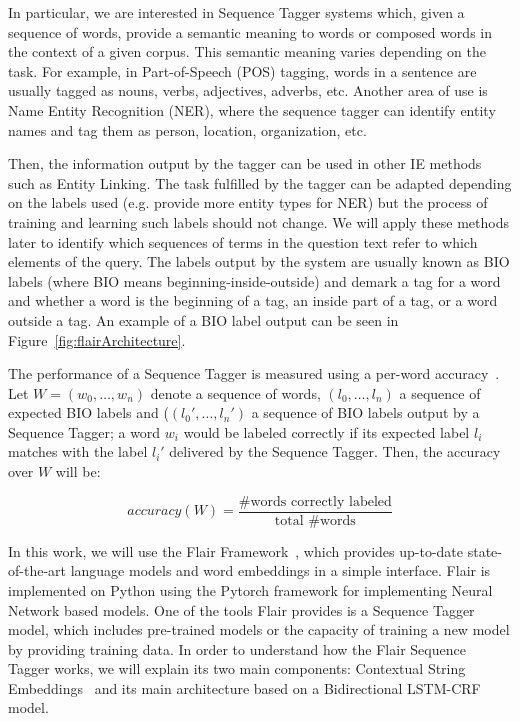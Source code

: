 In particular, we are interested in Sequence Tagger systems which, given a sequence of 
words, provide a semantic meaning to words or composed words in the context of a given 
corpus. This semantic meaning varies depending on the task. For example, in Part-of-Speech 
(POS) tagging, words in a sentence are usually tagged as nouns, verbs, adjectives, adverbs, 
etc. Another area of use is Name Entity Recognition (NER), where the sequence tagger can 
identify entity names and tag them as person, location, organization, etc. 

Then, the information output by the tagger can be used in other IE methods such as Entity 
Linking. The task fulfilled by the tagger can be adapted depending on the labels used 
(e.g. provide more entity types for NER) but the process of training and learning such 
labels should not change. We will apply these methods later to identify which sequences of 
terms in the question text refer to which elements of the query. The labels output by the 
system are usually known as BIO labels (where BIO means beginning-inside-outside) and 
demark a tag for a word and whether a word is the beginning of a tag, an inside part of a 
tag, or a word outside a tag. An example of a BIO label output can be seen in 
Figure~\ref{fig:flairArchitecture}.

The performance of a Sequence Tagger is measured using a per-word accuracy~\cite{seqlab:MarcusSM94}. 
Let $W=(w_0,\ldots,w_n)$ denote a sequence of words, $(l_0,\ldots,l_n)$ a sequence of 
expected BIO labels and ($(l_{0}',\ldots,l_{n}')$ a sequence of BIO labels output by a Sequence 
Tagger; a word $w_i$ would be labeled correctly if its expected label $l_i$ matches with the label 
$l_{i}'$ delivered by the Sequence Tagger. Then, the accuracy over $W$ will be:

\[accuracy(W)=\frac{\mbox{\#words correctly labeled}}{\mbox{total \# words}}\]

In this work, we will use the Flair Framework~\cite{seqlab:flair-AkbikBBRSV19}, which provides 
up-to-date state-of-the-art language models and word embeddings in a simple interface. Flair is 
implemented on Python using the Pytorch framework for implementing Neural Network based models. 
One of the tools Flair provides is a Sequence Tagger model, which includes pre-trained models or 
the capacity of training a new model by providing training data. In order to understand how the 
Flair Sequence Tagger works, we will explain its two main components: Contextual String 
Embeddings~\cite{seqlab:contextual-emb-AkbikBV18} and its main architecture based on a 
Bidirectional LSTM-CRF model.


